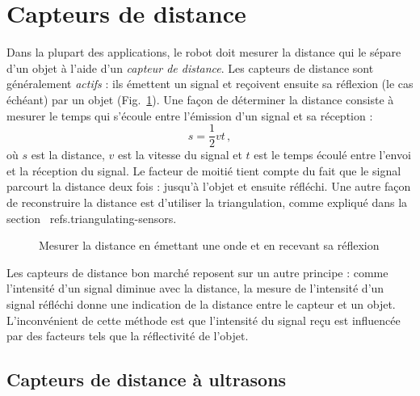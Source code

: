 \section{Capteurs de distance}\label{s.distance-sensors}

Dans la plupart des applications, le robot doit mesurer la distance qui le sépare d'un objet à l'aide d'un \textit{capteur de distance}. Les capteurs de distance sont généralement \emph{actifs} : ils émettent un signal et reçoivent ensuite sa réflexion (le cas échéant) par un objet (Fig.~\ref{fig.measure-d}). Une façon de déterminer la distance consiste à mesurer le temps qui s'écoule entre l'émission d'un signal et sa réception :
\begin{equation}
s = \frac{1}{2}vt\,,\label{eq.reflected}
\end{equation}
où $s$ est la distance, $v$ est la vitesse du signal et $t$ est le temps écoulé entre l'envoi et la réception du signal. Le facteur de moitié tient compte du fait que le signal parcourt la distance deux fois : jusqu'à l'objet et ensuite réfléchi. Une autre façon de reconstruire la distance est d'utiliser la triangulation, comme expliqué dans la section ~ref{s.triangulating-sensors}.

\begin{figure}
\begin{center}
\end{center}
\caption{Mesurer la distance en émettant une onde et en recevant sa réflexion}\label{fig.measure-d}
\end{figure}

Les capteurs de distance bon marché reposent sur un autre principe : comme l'intensité d'un signal diminue avec la distance, la mesure de l'intensité d'un signal réfléchi donne une indication de la distance entre le capteur et un objet. L'inconvénient de cette méthode est que l'intensité du signal reçu est influencée par des facteurs tels que la réflectivité de l'objet.


\subsection{Capteurs de distance à ultrasons}

